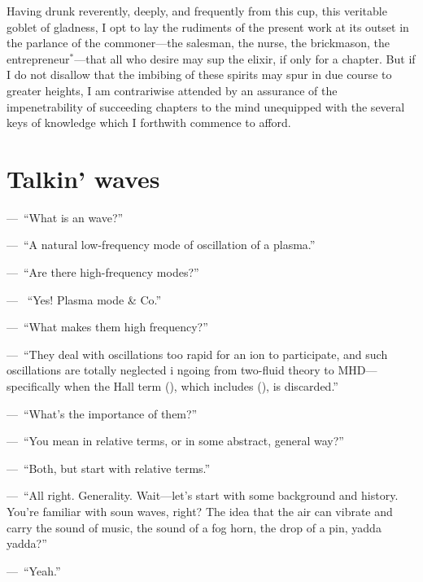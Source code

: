 Having drunk reverently, deeply, and frequently from this cup, this
veritable goblet of gladness, I opt to lay the rudiments of the
present work at its outset in the parlance of the commoner---the
salesman, the nurse, the brickmason, the entrepreneur$^*$---that all
who desire may sup the elixir, if only for a chapter. But if I do not
disallow that the imbibing of these spirits may spur in due course to
greater heights, I am contrariwise attended by an assurance of the
impenetrability of succeeding chapters to the mind unequipped with the
several keys of knowledge which I forthwith commence to afford.

\section{Talkin' waves}

\newlength{\savedparindent}
\newlength{\savedparskip}
\setlength{\savedparindent}{\parindent}
\setlength{\savedparskip}{\parskip}

\setlength\parindent{0pt}
\setlength\parskip{1ex plus 2pt minus 1pt}
\newcommand\X{\par\noindent---~}


\X ``What is an \Alf wave?''  

\X ``A natural low-frequency mode of
oscillation of a plasma.''  

\X ``Are there high-frequency modes?''  

\X
``Yes! Plasma mode \& Co.''  

\X ``What makes them high frequency?''


\X ``They deal with oscillations too rapid for an ion to participate,
and such oscillations are totally neglected i ngoing from two-fluid
theory to MHD---specifically when the Hall term (), which includes (),
is discarded.''  

\X ``What's the importance of them?''  

\X ``You mean
in relative terms, or in some abstract, general way?''  

\X ``Both, but
start with relative terms.''  

\X ``All right. Generality. Wait---let's
start with some background and history. You're familiar with soun
waves, right? The idea that the air can vibrate and carry the sound of
music, the sound of a fog horn, the drop of a pin, yadda yadda?''

\X ``Yeah.''


